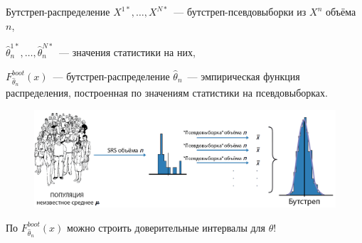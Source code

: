 \documentclass[9pt,pdf,utf8,hyperref={unicode},aspectratio=169]{beamer}
\begin{document}
\begin{frame}{Бутстреп-распределение}
	$X^{1*}, \dots, X^{N*}$~--- бутстреп-псевдовыборки из $X^n$ объёма $n$, 
	
	$\hat{\theta}_n^{1*}, \dots, \hat{\theta}_n^{N*}$~--- значения статистики на них, 
	
	$F_{\hat{\theta}_n}^{boot}(x)$~--- бутстреп-распределение $\hat{\theta}_n$~--- эмпирическая функция распределения, построенная по значениям статистики на псевдовыборках.
	
	\bigskip
	
	\begin{figure}
		\includegraphics[width=\textwidth]{boot3.png}
	\end{figure}
	
	\bigskip
	
	По $F_{\hat{\theta}_n}^{boot}(x)$ можно строить доверительные интервалы для $\theta$!
\end{frame}
\end{document}
